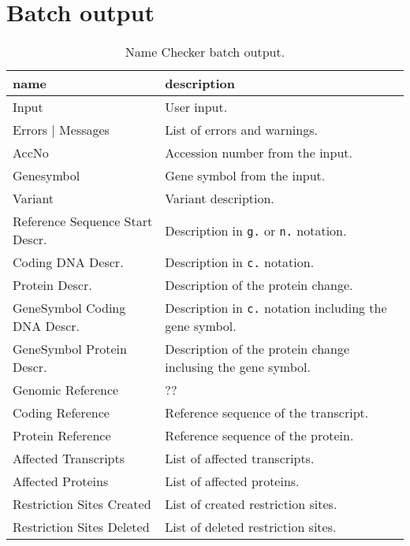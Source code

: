 \documentclass{article}
\begin{document}
\section{Batch output} \label{sec:batchoutput}
\begin{table}[h]
  \caption{Name Checker batch output.}
  \label{tab:namecheckbatch}
  \begin{center}
    \begin{tabular}{l|l}
      name                             & description\\
      \hline
      Input                            & User input.\\
      Errors | Messages                & List of errors and warnings.\\
      AccNo                            & Accession number from the input.\\
      Genesymbol                       & Gene symbol from the input.\\
      Variant                          & Variant description.\\
      Reference Sequence Start Descr.  & Description in \texttt{g.} or
        \texttt{n.} notation.\\
      Coding DNA Descr.                & Description in \texttt{c.} notation.\\
      Protein Descr.                   & Description of the protein change.\\
      GeneSymbol Coding DNA Descr.     & Description in \texttt{c.} notation
        including the gene symbol.\\
      GeneSymbol Protein Descr.        & Description of the protein change
        inclusing the gene symbol.\\
      Genomic Reference                & ??\\
      Coding Reference                 & Reference sequence of the
        transcript.\\
      Protein Reference                & Reference sequence of the protein.\\
      Affected Transcripts             & List of affected transcripts.\\
      Affected Proteins                & List of affected proteins.\\
      Restriction Sites Created        & List of created restriction sites.\\
      Restriction Sites Deleted        & List of deleted restriction sites.\\
    \end{tabular}
  \end{center}
\end{table}
\end{document}
